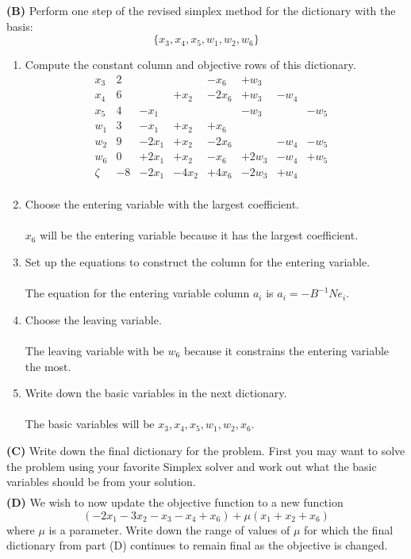 \documentclass[11pt]{article}
\begin{document}
\noindent\textbf{(B)} Perform one step of the revised simplex method for the dictionary with the basis:
\[ \{x_3, x_4, x_5, w_1, w_2, w_6 \} \]

\begin{enumerate}
\item Compute the constant column and objective rows of this dictionary.
  \[\begin{array}{r|ccccccccccccc}
  x_3 & 2 & & & -x_6 & +w_3 & & & \\
  x_4 & 6 & & +x_2 & -2x_6 & +w_3 & -w_4 & \\
  x_5 & 4 & -x_1 & & & -w_3 & & -w_5 \\
  w_1 & 3 & -x_1 & +x_2 & +x_6 & & & \\
  w_2 & 9 & -2x_1 & +x_2 & -2x_6 & & -w_4 & -w_5 \\
  w_6 & 0 & +2x_1 & +x_2 & -x_6 & +2w_3 & -w_4 & +w_5 \\
  \hline
  \zeta & -8 & -2x_1 & -4x_2 & +4x_6 & -2w_3 & +w_4 & \\
  \end{array}\]
\item Choose the entering variable with the largest coefficient.\\
\\
$x_6$ will be the entering variable because it has the largest coefficient.
\item Set up the equations to construct the column for the entering
  variable.\\
  \\
  The equation for the entering variable column $a_i$ is $a_i = -B^{-1}Ne_i$.

\item Choose the leaving variable.\\
\\
The leaving variable with be $w_6$ because it constrains the entering variable the most.
\item Write down the basic variables in the next dictionary.\\
\\
The basic variables will be $x_3,x_4,x_5,w_1,w_2,x_6$.
\end{enumerate}


\noindent\textbf{(C)} Write down the final dictionary for the
problem. First you may want to solve the problem using your favorite
Simplex solver and work out what the basic variables should be from
your solution.
\\
 \[\begin{array}{r|ccccccccccccc}
  \end{array}\]
\noindent\textbf{(D)} We wish to now update the objective function to
a new function 
\[  (-2 x_1  - 3 x_2  - x_3  - x_4 + x_6 )  + \mu ( x_1 + x_2 +
  x_6) \]
where $\mu$ is a parameter. Write down the range of values of $\mu$
for which the final dictionary from part (D) continues to remain final
as the objective is changed.
\end{document}
